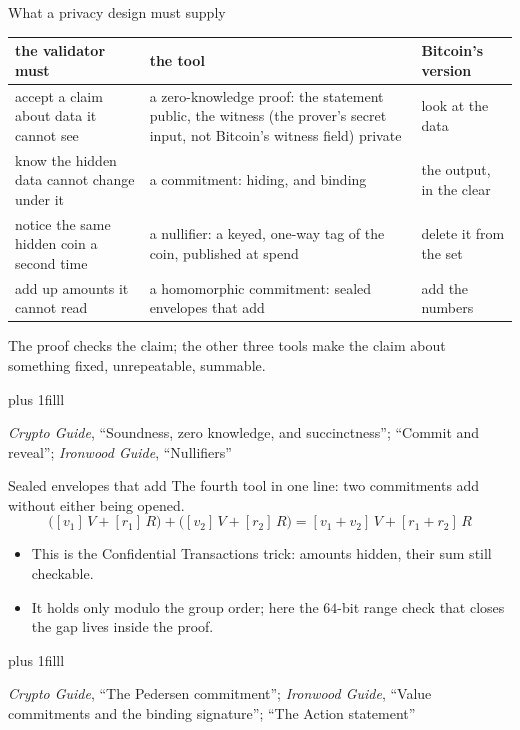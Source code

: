 \documentclass[aspectratio=169,11pt]{beamer}
\newcommand{\src}[1]{\par\vskip0pt plus 1filll
  {\fontsize{6}{7.2}\selectfont\color{arbdim}\raggedright #1\par}}
\begin{document}
\begin{frame}{What a privacy design must supply}
\begin{center}\small\raggedright
\begin{tabular}{@{}p{}p{}p{}@{}}
\toprule
the validator must & the tool & Bitcoin's version \\
\midrule
accept a claim about data it cannot see & a zero-knowledge proof: the
  statement public, the witness (the prover's secret input, not
  Bitcoin's witness field) private & look at the data \\
know the hidden data cannot change under it & a commitment: hiding, and
  binding & the output, in the clear \\
notice the same hidden coin a second time & a nullifier: a keyed, one-way
  tag of the coin, published at spend & delete it from the set \\
add up amounts it cannot read & a homomorphic commitment: sealed
  envelopes that add & add the numbers \\
\bottomrule
\end{tabular}
\end{center}
\medskip
The proof checks the claim; the other three tools make the claim about
something fixed, unrepeatable, summable.
\src{\emph{Crypto Guide}, ``Soundness, zero knowledge, and succinctness''; ``Commit and reveal'';
  \emph{Ironwood Guide}, ``Nullifiers''}
\end{frame}

\begin{frame}{Sealed envelopes that add}
The fourth tool in one line: two commitments add without either being
opened.
\[
\bigl([v_1]\,V + [r_1]\,R\bigr) + \bigl([v_2]\,V + [r_2]\,R\bigr)
  = [v_1 + v_2]\,V + [r_1 + r_2]\,R
\]
\begin{itemize}
  \item This is the Confidential Transactions trick: amounts hidden, their
    sum still checkable.
  \item It holds only modulo the group order; here the $64$-bit range check
    that closes the gap lives inside the proof.
\end{itemize}
\src{\emph{Crypto Guide}, ``The Pedersen commitment''; \emph{Ironwood Guide},
  ``Value commitments and the binding signature''; ``The Action statement''}
\end{frame}
\end{document}
